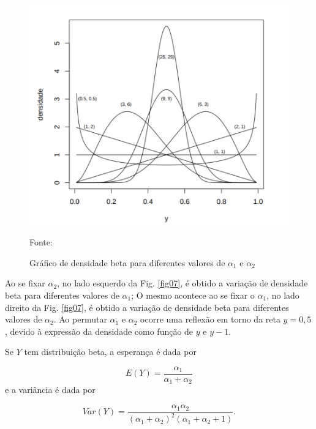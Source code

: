 \begin{figure}[!h]
	\centering
	\includegraphics[keepaspectratio=true,scale=0.3]{figuras/dist-beta1.png}
	\caption{Gráfico de densidade beta para diferentes valores de $\alpha_1$ e $\alpha_2$}
	Fonte: \cite{gomes2005}
	\label{fig06}
\end{figure}


Ao se fixar $\alpha_2$, no lado esquerdo da Fig. \ref{fig07}, é obtido a variação de densidade beta para diferentes valores de $\alpha_1$; O mesmo acontece ao se fixar o $\alpha_1$, no lado direito da Fig. \ref{fig07}, é obtido a variação de densidade beta para diferentes valores de $\alpha_2$. Ao permutar $\alpha_1$ e $\alpha_2$ ocorre uma reflexão em torno da reta $y = 0,5$, devido à expressão da densidade como função de $y$ e $y-1$. 

Se $Y$ tem distribuição beta, a esperança é dada por

\begin{equation}
E(Y) = \frac {\alpha_1}{\alpha_1 + \alpha_2}
\end{equation}
%
e a variância é dada por

\begin{equation}
Var(Y) = \frac{\alpha_1\alpha_2}{(\alpha_1+\alpha_2)^2(\alpha_1+\alpha_2+1)}.
\end{equation}


